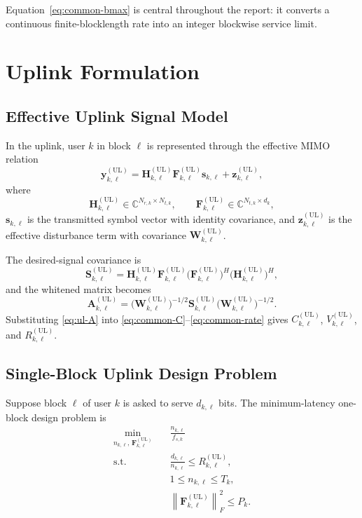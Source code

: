 \documentclass[11pt]{article}
\newcommand{\C}{\mathbb{C}}
\newcommand{\Hc}{\mathbf{H}}
\newcommand{\F}{\mathbf{F}}
\newcommand{\A}{\mathbf{A}}
\newcommand{\Smat}{\mathbf{S}}
\newcommand{\Wmat}{\mathbf{W}}
\newcommand{\norm}[1]{\left\lVert #1 \right\rVert}
\newcommand{\UL}{\mathrm{UL}}
\begin{document}
Equation~\eqref{eq:common-bmax} is central throughout the report: it converts a
continuous finite-blocklength rate into an integer blockwise service limit.

\section{Uplink Formulation}

\subsection{Effective Uplink Signal Model}

In the uplink, user $k$ in block $\ell$ is represented through the effective
MIMO relation
\begin{equation}
\mathbf y_{k,\ell}^{(\UL)}
=
\Hc_{k,\ell}^{(\UL)}
\F_{k,\ell}^{(\UL)}
\mathbf s_{k,\ell}
+
\mathbf z_{k,\ell}^{(\UL)},
\label{eq:ul-signal}
\end{equation}
where
\begin{equation}
\Hc_{k,\ell}^{(\UL)} \in \C^{N_{r,k}\times N_{t,k}},
\qquad
\F_{k,\ell}^{(\UL)} \in \C^{N_{t,k}\times d_k},
\label{eq:ul-dimensions}
\end{equation}
$\mathbf s_{k,\ell}$ is the transmitted symbol vector with identity covariance,
and $\mathbf z_{k,\ell}^{(\UL)}$ is the effective disturbance term with
covariance $\Wmat_{k,\ell}^{(\UL)}$.

The desired-signal covariance is
\begin{equation}
\Smat_{k,\ell}^{(\UL)}
=
\Hc_{k,\ell}^{(\UL)}
\F_{k,\ell}^{(\UL)}
\bigl(\F_{k,\ell}^{(\UL)}\bigr)^H
\bigl(\Hc_{k,\ell}^{(\UL)}\bigr)^H,
\label{eq:ul-signal-cov}
\end{equation}
and the whitened matrix becomes
\begin{equation}
\A_{k,\ell}^{(\UL)}
=
\bigl(\Wmat_{k,\ell}^{(\UL)}\bigr)^{-1/2}
\Smat_{k,\ell}^{(\UL)}
\bigl(\Wmat_{k,\ell}^{(\UL)}\bigr)^{-1/2}.
\label{eq:ul-A}
\end{equation}
Substituting \eqref{eq:ul-A} into
\eqref{eq:common-C}--\eqref{eq:common-rate} gives
$C_{k,\ell}^{(\UL)}$, $V_{k,\ell}^{(\UL)}$, and
$R_{k,\ell}^{(\UL)}$.

\subsection{Single-Block Uplink Design Problem}

Suppose block $\ell$ of user $k$ is asked to serve $d_{k,\ell}$ bits. The
minimum-latency one-block design problem is
\begin{subequations}
\begin{align}
\min_{n_{k,\ell},\,\F_{k,\ell}^{(\UL)}}
\quad
&
\frac{n_{k,\ell}}{f_{s,k}}
\label{eq:ul-single-obj}
\\
\text{s.t.}\quad
&
\frac{d_{k,\ell}}{n_{k,\ell}}
\le
R_{k,\ell}^{(\UL)},
\label{eq:ul-single-rate}
\\
&
1 \le n_{k,\ell} \le T_k,
\label{eq:ul-single-n}
\\
&
\norm{\F_{k,\ell}^{(\UL)}}_F^2 \le P_k.
\label{eq:ul-single-power}
\end{align}
\end{subequations}
\end{document}

